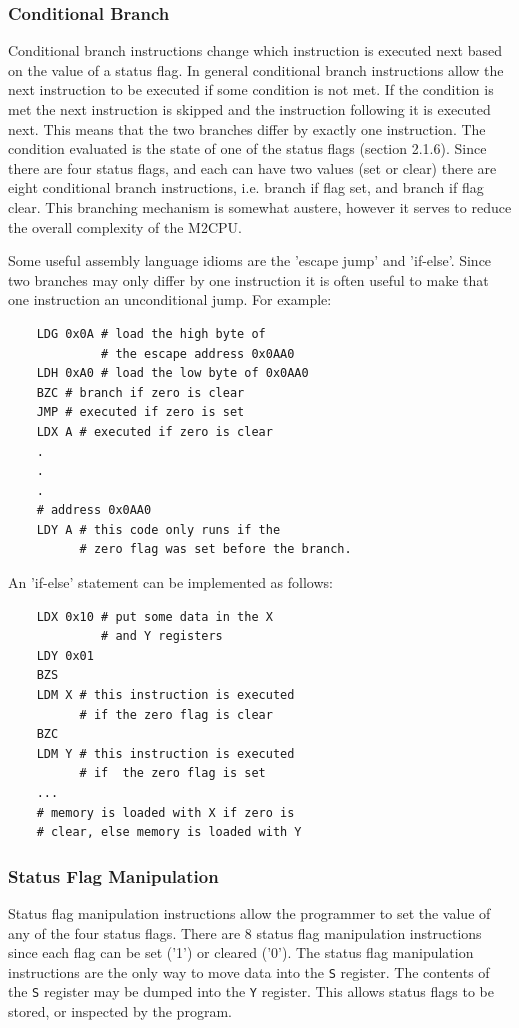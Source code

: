 \documentclass[a4paper,12pt]{article}
\newcommand{\mt}{M2CPU}
\newcommand{\Yr}{\texttt{Y}}
\newcommand{\Sr}{\texttt{S}}
\begin{document}
\subsubsection{Conditional Branch}
Conditional branch instructions change which instruction is executed next based 
on the value of a status flag. In general conditional branch instructions allow
the next instruction to be executed if some condition is not met. If the 
condition is met the next instruction is skipped and the instruction following 
it is executed next. This means that the two branches differ by exactly one 
instruction. The condition evaluated is the state of one of the status flags
(section 2.1.6). Since there are four status flags, and each can have two 
values (set or clear) there are eight conditional branch instructions, i.e.
branch if flag set, and branch if flag clear. This branching mechanism is
somewhat austere, however it serves to reduce the overall complexity of the
\mt{}.
\par

Some useful assembly language idioms are the 'escape jump' and 'if-else'. Since
two branches may only differ by one instruction it is often useful to make that 
one instruction an unconditional jump. For example:
\lstset{
	basicstyle=\small\ttfamily
}
\begin{lstlisting}
	LDG 0x0A # load the high byte of 
	         # the escape address 0x0AA0
	LDH 0xA0 # load the low byte of 0x0AA0
	BZC # branch if zero is clear
	JMP # executed if zero is set
	LDX A # executed if zero is clear
	.
	.
	.
	# address 0x0AA0
	LDY A # this code only runs if the 
	      # zero flag was set before the branch.
\end{lstlisting}
An 'if-else' statement can be implemented as follows:
\begin{lstlisting}
	LDX 0x10 # put some data in the X 
	         # and Y registers
	LDY 0x01
	BZS
	LDM X # this instruction is executed
	      # if the zero flag is clear
	BZC
	LDM Y # this instruction is executed
	      # if  the zero flag is set
	... 
	# memory is loaded with X if zero is
	# clear, else memory is loaded with Y
\end{lstlisting}
\par

\subsubsection{Status Flag Manipulation}
Status flag manipulation instructions allow the programmer to set the value of
any of the four status flags. There are 8 status flag manipulation instructions
since each flag can be set ('1') or cleared ('0'). The status flag manipulation
instructions are the only way to move data into the \Sr{} register. The 
contents of the \Sr{} register may be dumped into the \Yr{} register. This 
allows status flags to be stored, or inspected by the program.
\par
\end{document}
